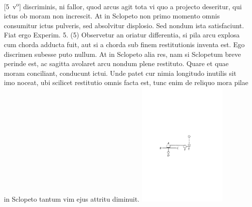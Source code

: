 [5~v\textsuperscript{o}] discriminis, ni fallor, quod arcus\protect{} agit tota vi\protect{}  quo a projecto deseritur, qui ictus\protect{} ob moram non increscit. At in Sclopeto\protect{} non primo momento omnis consumitur ictus\protect{} pulveris, sed absolvitur displosio. Sed nondum ista satisfaciunt. Fiat ergo Experim. 5.
\pend
\count{}
\pstart
(5) Observetur an oriatur differentia, si pila\protect{} arcu\protect{} explosa cum chorda adducta fuit, aut si a chorda sub finem restitutionis inventa est. Ego discrimen subesse puto nullum. At in Sclopeto\protect{} alia res, nam si Sclopetum\protect{} breve perinde est, ac  sagitta\protect{} avolaret arcu\protect{} nondum plene restituto. Quare et quae moram conciliant, conducunt ictui. Unde patet cur nimia longitudo inutilis sit imo noceat, ubi scilicet restitutio omnis facta est, tunc enim de reliquo mora pilae\protect{} in Sclopeto\protect{} tantum vim\protect{} ejus attritu\protect{} diminuit.
\pend
\count{}
\count{}
\count{}
\vspace{1.5em}
\pstart
\centering  \includegraphics[trim = 0mm 0mm 0mm 0mm, clip, width=0.33\textwidth]{images/lh03705_005v-d1.pdf}\\
